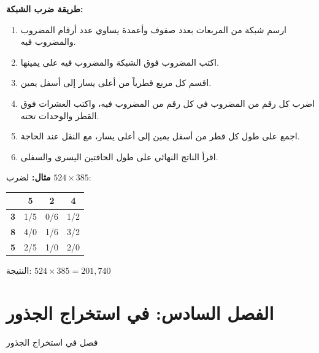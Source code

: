 \documentclass[11pt,a4paper]{book}
\newcommand{\ar}[1]{\arabicfont\beginR #1\endR}
\newcommand{\arLarge}[1]{{\Large\arabicfont\beginR #1\endR}}
\newenvironment{arabicbox}{%
  \begin{framed}
  \begin{minipage}{\linewidth-2\fboxsep-2\fboxrule}
  \setlength{\parindent}{0pt}
  \linespread{1.3}\selectfont
}{%
  \end{minipage}
  \end{framed}
}
\newenvironment{mathalgo}{%
  \par\vspace{0.3cm}
  \begin{framed}
  \setlength{\parindent}{0pt}
}{%
  \end{framed}
  \par\vspace{0.3cm}
}
\begin{document}
\begin{mathalgo}
\textbf{\ar{طريقة ضرب الشبكة:}}
\begin{enumerate}[nosep]
  \item \ar{ارسم شبكة من المربعات بعدد صفوف وأعمدة يساوي عدد أرقام المضروب والمضروب فيه.}
  \item \ar{اكتب المضروب فوق الشبكة والمضروب فيه على يمينها.}
  \item \ar{اقسم كل مربع قطرياً من أعلى يسار إلى أسفل يمين.}
  \item \ar{اضرب كل رقم من المضروب في كل رقم من المضروب فيه، واكتب العشرات فوق القطر والوحدات تحته.}
  \item \ar{اجمع على طول كل قطر من أسفل يمين إلى أعلى يسار، مع النقل عند الحاجة.}
  \item \ar{اقرأ الناتج النهائي على طول الحافتين اليسرى والسفلى.}
\end{enumerate}
\end{mathalgo}

\vspace{0.3cm}

\noindent\textbf{\ar{مثال:}} \ar{لضرب} $524 \times 385$:

\begin{center}
\begin{tabular}{|c|c|c|c|}
\hline
& \textbf{5} & \textbf{2} & \textbf{4} \\
\hline
\textbf{3} & \multicolumn{1}{c|}{1/5} & \multicolumn{1}{c|}{0/6} & \multicolumn{1}{c|}{1/2} \\
\hline
\textbf{8} & \multicolumn{1}{c|}{4/0} & \multicolumn{1}{c|}{1/6} & \multicolumn{1}{c|}{3/2} \\
\hline
\textbf{5} & \multicolumn{1}{c|}{2/5} & \multicolumn{1}{c|}{1/0} & \multicolumn{1}{c|}{2/0} \\
\hline
\end{tabular}
\end{center}

\noindent \ar{النتيجة:} $\boxed{524 \times 385 = 201{,}740}$

\section{\ar{الفصل السادس: في استخراج الجذور}}

\begin{arabicbox}
\begin{center}
\arLarge{فصل في استخراج الجذور}
\end{center}
\end{arabicbox}
\end{document}
